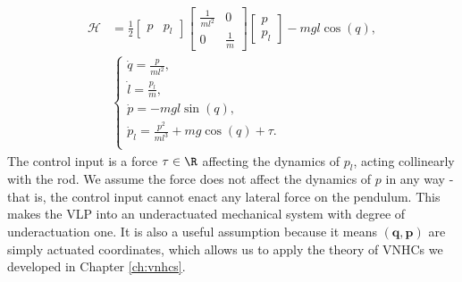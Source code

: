 \begin{align}\label{eqn:vlp-hamiltonian-with-pl}
   \mathcal{H} &= \frac{1}{2} \begin{bmatrix} p & p_l \end{bmatrix}
      \begin{bmatrix}
         \frac{1}{ml^2}  & 0 \\
         0 & \frac{1}{m}
      \end{bmatrix} \begin{bmatrix} p \\ p_l \end{bmatrix} - mgl\cos(q)
      , \\
     &\begin{cases}
        \dot{q} = \frac{p}{ml^2} 
        ,\\
        \dot{l} = \frac{p_l}{m} 
        ,\\
        \dot{p} = -mgl\sin(q) 
        ,\\
        \dot{p}_l = \frac{p^2}{ml^3} + mg\cos(q) + \tau
        . \\
   \end{cases} \nonumber
\end{align}
The control input is a force \(\tau \in \R\) affecting the dynamics of
\(p_l\), acting collinearly with the rod.
We assume the force does not affect the dynamics of \(p\) in any way -
that is, the control input cannot enact any lateral force on the pendulum.
This makes the VLP into an underactuated mechanical system with degree of
underactuation one. 
It is also a useful assumption because it means \((\mathbf{q},\mathbf{p})\) 
are simply actuated coordinates, which allows us to apply the theory of VNHCs we
developed in Chapter \ref{ch:vnhcs}.

